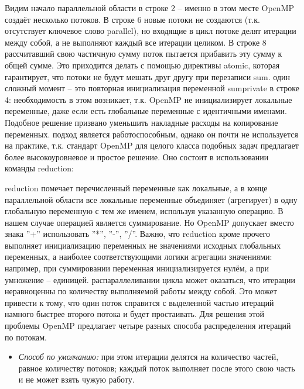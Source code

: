 {	\begin{figure}[H]
		
	\end{figure}
	Видим начало параллельной области в строке 2 – именно в этом месте OpenMP создаёт несколько потоков. В строке 6 новые потоки не создаются (т.к. отсутствует ключевое слово parallel), но входящие в цикл потоке делят итерации между собой, а не выполняют каждый все итерации целиком. В строке 8 рассчитавший свою частичную сумму поток пытается прибавить эту сумму к общей сумме. Это приходится делать с помощью директивы atomic, которая гарантирует, что потоки не будут мешать друг другу при перезаписи sum. 
	 один сложный момент – это повторная инициализация переменной sum\textunderscore private в строке 4: необходимость в этом возникает, т.к. OpenMP не инициализирует локальные переменные, даже если есть глобальные переменные с идентичными именами. Подобное решение призвано уменьшить накладные расходы на копирование переменных.
	 подход является работоспособным, однако он почти не используется на практике, т.к. стандарт OpenMP для целого класса подобных задач предлагает более высокоуровневое и простое решение. Оно состоит в использовании команды reduction:
	\begin{figure}[H]
		
	\end{figure}
	 reduction помечает перечисленный переменные как локальные, а в конце параллельной области все локальные переменные объединяет (агрегирует) в одну глобальную переменную с тем же именем, используя указанную операцию. В нашем случае операцией является суммирование. Но OpenMP допускает вместо знака ''+'' использовать ''*'', ''-'', ''/''. Важно, что reduction кроме прочего выполняет инициализацию переменных не значениями исходных глобальных переменных, а наиболее соответствующими логики агрегации значениями: например, при суммировании переменная инициализируется нулём, а при умножение – единицей.
	 распараллеливании цикла может оказаться, что итерации неравноценны по количеству выполняемой работы между собой. Это может привести к тому, что один поток справится с выделенной частью итераций намного быстрее второго потока и будет простаивать. Для решения этой проблемы OpenMP предлагает четыре разных способа распределения итераций по потокам. 
	\begin{itemize}
		\item\textit{Способ по умолчанию:} при этом итерации делятся на количество частей, равное количеству потоков; каждый поток выполняет после этого свою часть и не может взять чужую работу.

\end{itemize}}
